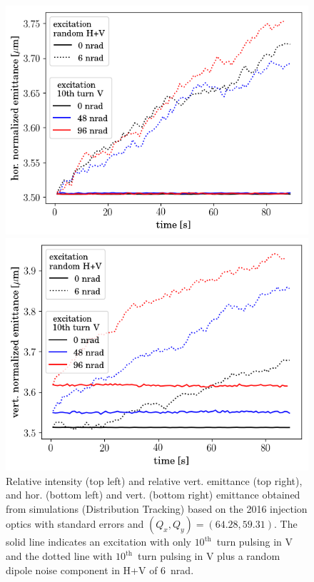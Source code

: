 \documentclass[%
 reprint,
 amsmath,amssymb,
 aps,
prstab,
]{revtex4-1}
\begin{document}
\begin{figure}[h]
\begin{minipage}[t]{0.49\linewidth}
		\includegraphics[width=1.0\linewidth]{2016injerra2b2uran1_2e-3_10thV_3_5um_emit1.png}
	\end{minipage}	
	\begin{minipage}[t]{0.49\linewidth}
		\centering
		\includegraphics[width=1.0\linewidth]{2016injerra2b2uran1_2e-3_10thV_3_5um_emit2.png}
	\end{minipage}	
	\caption{\label{fig:10thsim} Relative intensity (top left) and relative vert. emittance (top right), and hor. (bottom left) and vert. (bottom right) emittance obtained from simulations (Distribution Tracking) based on the 2016 injection optics with standard errors and $(Q_x,Q_y)=(64.28,59.31)$. The solid line indicates an excitation with only $10^{\mathrm{th}}$~turn pulsing in V and the dotted line with $10^{\mathrm{th}}$~turn pulsing in V plus a random dipole noise component in H+V of 6~nrad.}
\end{figure}
\end{document}
